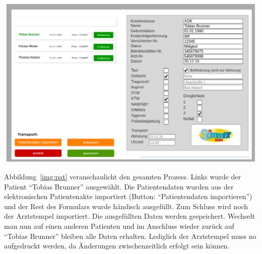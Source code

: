 \documentclass[a4paper, ngerman, 12pt]{scrartcl}
\begin{document}
\begin{center}
\begin{minipage}{\textwidth}
\centering
\includegraphics[width=\textwidth]{Bilder/pat1.png}
\label{img:pat}
\end{minipage}
\end{center}
Abbildung~\ref{img:pat} veranschaulicht den gesamten Prozess. Links wurde der Patient ``Tobias Brunner'' ausgewählt. Die Patientendaten wurden aus der elektronischen Patientenakte importiert (Button: ``Patientendaten importieren'') und der Rest des Formulars wurde händisch ausgefüllt. Zum Schluss wird noch der Arztstempel importiert. Die ausgefüllten Daten werden gespeichert. Wechselt man nun auf einen anderen Patienten und im Anschluss wieder zurück auf ``Tobias Brunner'' bleiben alle Daten erhalten. Lediglich der Arztstempel muss no aufgedruckt werden, da Änderungen zwischenzeitlich erfolgt sein können.
\end{document}
